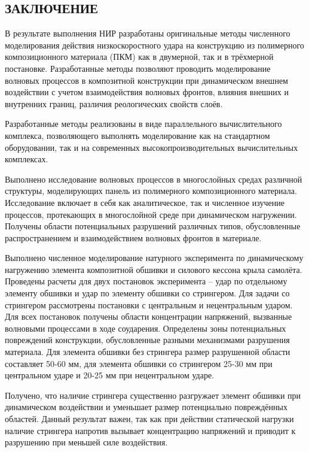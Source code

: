 \begin{center}\section*{ЗАКЛЮЧЕНИЕ}\end{center}

В результате выполнения НИР разработаны оригинальные методы численного моделирования действия низкоскоростного удара на конструкцию из полимерного композиционного материала (ПКМ) как в двумерной, так и в трёхмерной постановке. Разработанные методы позволяют проводить моделирование волновых процессов в композитной конструкции при динамическом внешнем воздействии с учетом взаимодействия волновых фронтов, влияния внешних и внутренних границ, различия реологических свойств слоёв.

Разработанные методы реализованы в виде параллельного вычислительного комплекса, позволяющего выполнять моделирование как на стандартном оборудовании, так и на современных высокопроизводительных вычислительных комплексах.

Выполнено исследование волновых процессов в многослойных средах различной структуры, моделирующих панель из полимерного композиционного материала. Исследование включает в себя как аналитическое, так и численное изучение процессов, протекающих в многослойной среде при динамическом нагружении. Получены области потенциальных разрушений различных типов, обусловленные распространением и взаимодействием волновых фронтов в материале.

Выполнено численное моделирование натурного эксперимента по динамическому нагружению элемента композитной обшивки и силового кессона крыла самолёта. Проведены расчеты для двух постановок эксперимента -- удар по отдельному элементу обшивки и удар по элементу обшивки со стрингером. Для задачи со стрингером рассмотрены постановки с центральным и нецентральным ударом. Для всех постановок получены области концентрации напряжений, вызванные волновыми процессами в ходе соударения. Определены зоны потенциальных повреждений конструкции, обусловленные разными механизмами разрушения материала. Для элемента обшивки без стрингера размер разрушенной области составляет 50-60 мм, для элемента обшивки со стрингером 25-30 мм при центральном ударе и 20-25 мм при нецентральном ударе.

Получено, что наличие стрингера существенно разгружает элемент обшивки при динамическом воздействии и уменьшает размер потенциально повреждённых областей. Данный результат важен, так как при действии статической нагрузки наличие стрингера напротив вызывает концентрацию напряжений и приводит к разрушению при меньшей силе воздействия.

